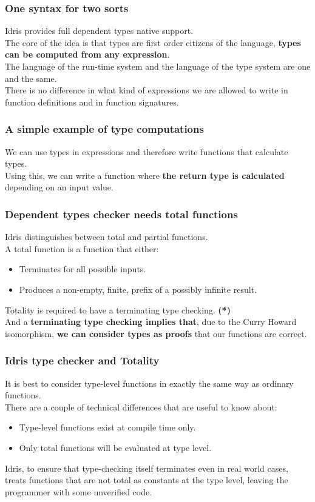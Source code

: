 \begin{frame}
\frametitle{One syntax for two sorts}
Idris provides full dependent types native support.\\ \medskip
The core of the idea is that types are first order citizens of the language, \textbf{types can be computed from any expression}.
\\ \medskip
The language of the run-time system and the language of the type system are one and the same.\\
There is no difference in what kind of expressions we are allowed to write in function definitions and in function signatures.
\end{frame}

\begin{frame}
\frametitle{A simple example of type computations}
We can use types in expressions and therefore write functions that calculate types.\\
\pause
Using this, we can write a function where \textbf{the return type is calculated} depending on an input value.
\end{frame}

\begin{frame}
\frametitle{Dependent types checker needs total functions}
Idris distinguishes between total and partial functions.\\ \medskip
A total function is a function that either:
\begin{itemize}
  \item Terminates for all possible inputs.
  \item Produces a non-empty, finite, prefix of a possibly infinite result.
\end{itemize}
Totality is required to have a terminating type checking. \textbf{(*)}
\\ \medskip
And a \textbf{terminating type checking implies that}, due to the Curry Howard isomorphism, \textbf{we can consider types as proofs} that our functions are correct.
\end{frame}


\begin{frame}
\frametitle{Idris type checker and Totality}
It is best to consider type-level functions in exactly the same way as ordinary functions.
\\ \medskip
There are a couple of technical differences that are useful to know about:
\begin{itemize}
	\item Type-level functions exist at compile time only.
	\item Only total functions will be evaluated at type level.
\end{itemize}
\medskip
Idris, to ensure that type-checking itself terminates even in real world cases, treats functions that are not total as constants at the type level, leaving the programmer with some unverified code.
\end{frame}


